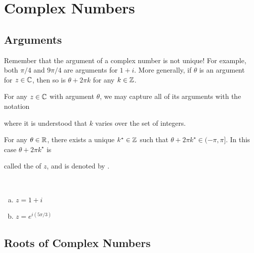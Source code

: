 \documentclass[11pt,fleqn,dvipsnames,usenames]{article}
\renewcommand{\headrulewidth}{1pt}
\newcommand{\blank}[1]{\underline{\hspace{#1}}}
\newcommand{\p}{\noindent}
\begin{document}
\fancyhead[L]{\course}
\fancyhead[R]{\term}
\renewcommand{\headrulewidth}{0.4pt}


\setcounter{section}{1}
\section{Complex Numbers}
\setcounter{subsection}{3}
\subsection{Arguments}

\p Remember that the argument of a complex number is not unique!  For example, both $\pi/4$ and $9\pi/4$ are arguments for $1 + i$.  More generally, if $\theta$ is an argument for $z\in\mathbb{C}$, then so is $\theta + 2\pi k$ for any $k\in \mathbb{Z}$.
\vsp

\notation For any $z\in\mathbb{C}$ with argument $\theta$, we may capture all of its arguments with the notation
\vspace{2cm}

\p where it is understood that $k$ varies over the set of integers.
\vsp

\fact For any $\theta\in\mathbb{R}$, there exists a unique $k^{\star}\in\mathbb{Z}$ such that $\theta + 2\pi k^{\star}\in (-\pi, \pi]$.  In this case $\theta + 2\pi k^{\star}$ is\\
\vsmsp

\p called the  of $z$, and is denoted by \blank{1cm}.
\vsp

\begin{examples}~
\begin{enumerate}[(a)]
\item $z = 1 + i$
\vspace{1cm}

\item $z = e^{i(5\pi/3)}$
\vspace{1cm}

\end{enumerate}
\end{examples}

\subsection{Roots of Complex Numbers}\label{rootsofunitysection}
\end{document}
